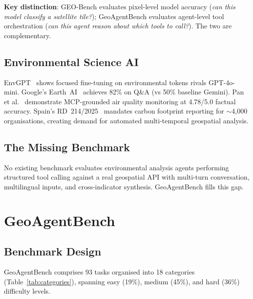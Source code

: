 \documentclass[10pt,twocolumn]{article}
\begin{document}
\textbf{Key distinction}: GEO-Bench evaluates pixel-level model accuracy (\emph{can this model classify a satellite tile?}); GeoAgentBench evaluates agent-level tool orchestration (\emph{can this agent reason about which tools to call?}). The two are complementary.

\subsection{Environmental Science AI}

EnvGPT~\cite{zhang2025envgpt} shows focused fine-tuning on environmental tokens rivals GPT-4o-mini. Google's Earth~AI~\cite{google2025earthai} achieves 82\% on Q\&A (vs 50\% baseline Gemini). Pan et al.~\cite{pan2025mcpairquality} demonstrate MCP-grounded air quality monitoring at 4.78/5.0 factual accuracy. Spain's RD~214/2025~\cite{spain2025rd214} mandates carbon footprint reporting for $\sim$4,000 organisations, creating demand for automated multi-temporal geospatial analysis.

\subsection{The Missing Benchmark}

No existing benchmark evaluates environmental analysis agents performing structured tool calling against a real geospatial API with multi-turn conversation, multilingual inputs, and cross-indicator synthesis. GeoAgentBench fills this gap.


\section{GeoAgentBench}
\label{sec:benchmark}

\subsection{Benchmark Design}

GeoAgentBench comprises 93 tasks organised into 18 categories (Table~\ref{tab:categories}), spanning easy (19\%), medium (45\%), and hard (36\%) difficulty levels.
\end{document}
